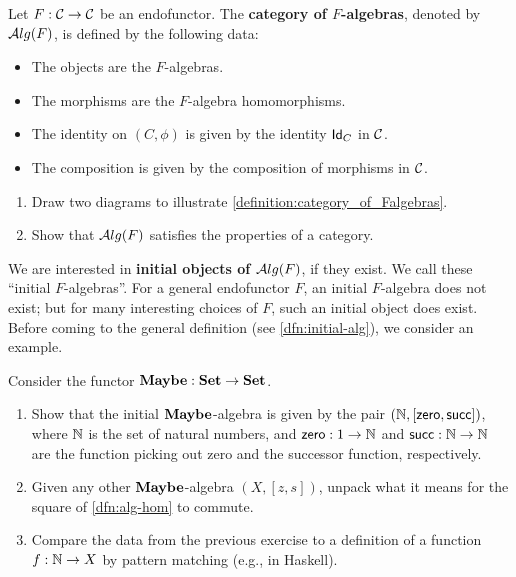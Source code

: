 \begin{dfn}\label{definition:category_of_Falgebras} Let $F:\CC\to \CC$ be an endofunctor. The \textbf{category of $F$-algebras}, denoted by $\ALG{F}$, is defined by the following data:
\begin{itemize}
\item The objects are the $F$-algebras.
\item The morphisms are the $F$-algebra homomorphisms.
\item The identity on $(C,\phi)$ is given by the identity $\Id[C]$ in $\CC$.
\item The composition is given by the composition of morphisms in $\CC$.
\end{itemize}
\end{dfn}

\begin{exer}
  \begin{enumerate}
  \item Draw two diagrams to illustrate \cref{definition:category_of_Falgebras}.
  \item Show that $\ALG{F}$ satisfies the properties of a category.
  \end{enumerate}
\end{exer}

We are interested in \textbf{initial objects of $\ALG{F}$}, if they exist.
We call these ``initial $F$-algebras''.
For a general endofunctor $F$, an initial $F$-algebra does not exist;
but for many interesting choices of $F$, such an initial object does exist.
Before coming to the general definition (see \cref{dfn:initial-alg}),
we consider an example.


\begin{exer}
  Consider the functor $\Maybe : \SET \to \SET$.
  \begin{enumerate}
  \item Show that the initial $\Maybe$-algebra is given by the pair $(\NN, [\Zero,\Succ])$, 
    where $\NN$ is the set of natural numbers, and $\Zero : 1 \to \NN$ and $\Succ : \NN\to\NN$ 
    are the function picking out zero and the successor function, respectively.
  \item Given any other $\Maybe$-algebra $(X,[z,s])$, unpack what it means for the square of \cref{dfn:alg-hom} to commute.
  \item Compare the data from the previous exercise to a definition of a function $f : \NN \to X$ by pattern matching (e.g., in Haskell).
  \end{enumerate}
\end{exer}



